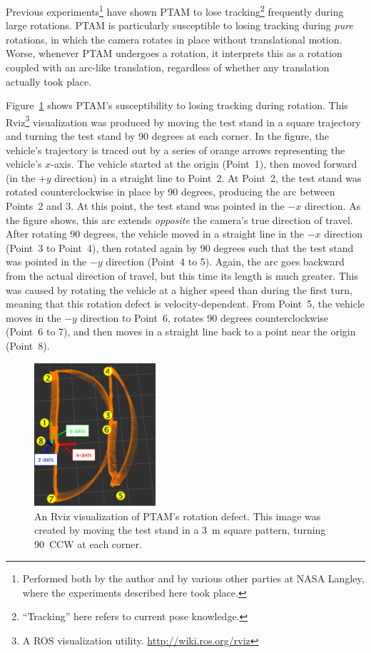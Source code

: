 Previous experiments\footnote{Performed both by the author and by various other parties at NASA Langley, where the experiments described here took place.} have shown PTAM to lose tracking\footnote{``Tracking'' here refers to current pose knowledge.} frequently during large rotations. PTAM is particularly susceptible to losing tracking during \textit{pure} rotations, in which the camera rotates in place without translational motion. Worse, whenever PTAM undergoes a rotation, it interprets this as a rotation coupled with an arc-like translation, regardless of whether any translation actually took place.

Figure~\ref{fig:rot_bug_rviz} shows PTAM's susceptibility to losing tracking during rotation. This Rviz\footnote{A ROS visualization utility. \url{http://wiki.ros.org/rviz}} visualization was produced by moving the test stand in a square trajectory and turning the test stand by 90 degrees at each corner. In the figure, the vehicle's trajectory is traced out by a series of orange arrows representing the vehicle's $x$-axis. The vehicle started at the origin (Point~1), then moved forward (in the $+y$ direction) in a straight line to Point~2. At Point~2, the test stand was rotated counterclockwise in place by 90 degrees, producing the arc between Points~2 and 3. At this point, the test stand was pointed in the $-x$ direction. As the figure shows, this arc extends \textit{opposite} the camera's true direction of travel. After rotating 90 degrees, the vehicle moved in a straight line in the $-x$ direction (Point~3 to Point~4), then rotated again by 90 degrees such that the test stand was pointed in the $-y$ direction (Point~4 to 5). Again, the arc goes backward from the actual direction of travel, but this time its length is much greater. This was caused by rotating the vehicle at a higher speed than during the first turn, meaning that this rotation defect is velocity-dependent. From Point~5, the vehicle moves in the $-y$ direction to Point~6, rotates 90 degrees counterclockwise (Point~6 to 7), and then moves in a straight line back to a point near the origin (Point~8).

\begin{figure}[t]
\centering
    \includegraphics[width=0.4\textwidth]{rot_bug_rviz}
  \caption[Rviz Visualization of Rotational Distortion]{An Rviz visualization of PTAM's rotation defect. This image was created by moving the test stand in a 3~m square pattern, turning 90\textdegree\ CCW at each corner.}
  \label{fig:rot_bug_rviz}
\end{figure}

